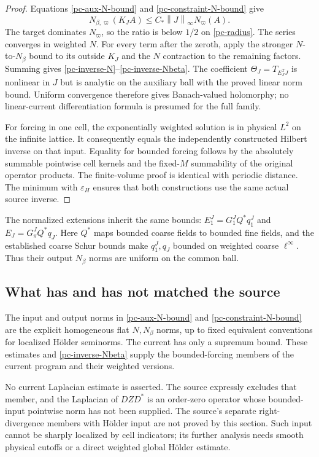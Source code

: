 \documentclass[11pt]{article}
\theoremstyle{remark}
\newcommand{\norm}[1]{\left\|#1\right\|}
\begin{document}
\begin{proof}
Equations \eqref{pc-aux-N-bound} and
\eqref{pc-constraint-N-bound} give
\[
 N_{\beta,\varpi}(K_JA)
          \le C_*\norm{J}_\infty N_\varpi(A).
\]
The target dominates $N_\varpi$, so the ratio is below $1/2$
on \eqref{pc-radius}. The series converges in weighted $N$.
For every term after the zeroth, apply the stronger $N$-to-$N_\beta$
bound to its outside $K_J$ and the $N$ contraction to the remaining
factors. Summing gives \eqref{pc-inverse-N}--\eqref{pc-inverse-Nbeta}.
The coefficient $\Theta_J=T_{E_J^TJ}$ is nonlinear in $J$ but is
analytic on the auxiliary ball with the proved linear norm bound.
Uniform convergence therefore gives Banach-valued holomorphy; no
linear-current differentiation formula is presumed for the full family.

For forcing in one cell, the exponentially weighted solution is in
physical $L^2$ on the infinite lattice. It consequently equals the
independently constructed Hilbert inverse on that input. Equality
for bounded forcing follows by the absolutely summable pointwise
cell kernels and the fixed-$M$ summability of the original operator
products. The finite-volume proof is identical with periodic
distance. The minimum with $\varepsilon_H$ ensures that both
constructions use the same actual source inverse.
\end{proof}

The normalized extensions inherit the same bounds:
$E_1^J=G_1^JQ^*q_1^J$ and $E_J=G_\pi^JQ^*q_J$.
Here $Q^*$ maps bounded coarse fields to bounded fine fields, and
the established coarse Schur bounds make $q_1^J,q_J$ bounded on
weighted coarse $\ell^\infty$. Thus their output $N_\beta$ norms
are uniform on the common ball.

\subsection{What has and has not matched the source}

The input and output norms in \eqref{pc-aux-N-bound} and
\eqref{pc-constraint-N-bound} are the explicit homogeneous flat
$N,N_\beta$ norms, up to fixed equivalent conventions for localized
H\"older seminorms. The current has only a supremum bound. These
estimates and \eqref{pc-inverse-Nbeta} supply the bounded-forcing
members of the current program and their weighted versions.

No current Laplacian estimate is asserted. The source expressly
excludes that member, and the Laplacian of $DZD^*$ is an order-zero
operator whose bounded-input pointwise norm has not been supplied.
The source's separate right-divergence members with H\"older input
are not proved by this section. Such input cannot be sharply
localized by cell indicators; its further analysis needs smooth
physical cutoffs or a direct weighted global H\"older estimate.
\end{document}
